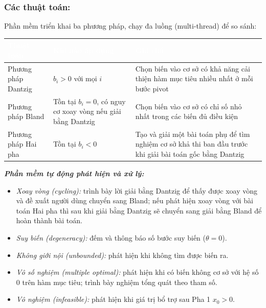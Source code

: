 \documentclass[12pt,a4paper]{article}
\begin{document}
\subsubsection*{Các thuật toán:}
Phần mềm triển khai ba phương pháp, chạy đa luồng (multi-thread) để so sánh:

\begin{table}[h]
    \centering
    \begin{tabularx}{\textwidth}{|l|X|X|}
        \hline
        \rowcolor{primary}
        \textcolor{white}{\textbf{Thuật toán}} & \textcolor{white}{\textbf{Khi nào áp dụng}} & \textcolor{white}{\textbf{Ghi chú}} \\ \hline
        Phương pháp Dantzig & $b_i > 0$ với mọi $i$ & Chọn biến vào cơ sở có khả năng cải thiện hàm mục tiêu nhiều nhất ở mỗi bước pivot \\ \hline
        Phương pháp Bland & Tồn tại $b_i = 0$, có nguy cơ xoay vòng nếu giải bằng Dantzig & Chọn biến vào cơ sở có chỉ số nhỏ nhất trong các biến đủ điều kiện \\ \hline
        Phương pháp Hai pha & Tồn tại $b_i < 0$ & Tạo và giải một bài toán phụ để tìm nghiệm cơ sở khả thi ban đầu trước khi giải bài toán gốc bằng Dantzig \\ \hline
    \end{tabularx}
\end{table}

\textit{\textbf{Phần mềm tự động phát hiện và xử lý:}}
\begin{itemize}[label=\textcolor{secondary}{$-$}, itemsep=1pt]
    \item \textit{Xoay vòng (cycling):} trình bày lời giải bằng Dantzig để thấy được xoay vòng và đề xuất người dùng chuyển sang Bland; nếu phát hiện xoay vòng với bài toán Hai pha thì sau khi giải bằng Dantzig sẽ chuyển sang giải bằng Bland để hoàn thành bài toán.
    \item \textit{Suy biến (degeneracy):} đếm và thông báo số bước suy biến ($\theta = 0$). 
    \item \textit{Không giới nội (unbounded):} phát hiện khi không tìm được biến ra. 
    \item \textit{Vô số nghiệm (multiple optimal):} phát hiện khi có biến không cơ sở với hệ số 0 trên hàm mục tiêu; trình bày nghiệm tổng quát theo tham số.
    \item \textit{Vô nghiệm (infeasible):} phát hiện khi giá trị bổ trợ sau Pha 1 $x_0 > 0$. 
\end{itemize}
\end{document}

